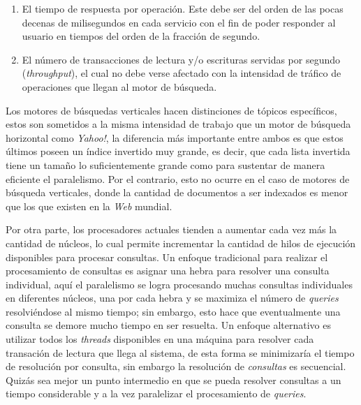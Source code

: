 \begin{enumerate}
  \item El tiempo de respuesta por operación. Este debe ser del orden de las pocas decenas de milisegundos en cada servicio con el fin de poder responder al usuario en tiempos del orden de la fracción de segundo.
  \item El número de transacciones de lectura y/o escrituras servidas por segundo (\textit{throughput}), el cual no debe verse afectado con la intensidad de tráfico de operaciones que llegan al motor de búsqueda.
\end{enumerate}

Los motores de búsquedas verticales hacen distinciones de tópicos específicos, estos son sometidos a la misma intensidad de trabajo que un motor de búsqueda horizontal como \textit{Yahoo!}, la diferencia más importante entre ambos es que estos últimos poseen un índice invertido muy grande, es decir, que cada lista invertida tiene un tamaño lo suficientemente grande como para sustentar de manera eficiente el paralelismo. Por el contrario, esto no ocurre en el caso de motores de búsqueda verticales, donde la cantidad de documentos a ser indexados es menor que los que existen en la \textit{Web} mundial.

Por otra parte, los procesadores actuales tienden a aumentar cada vez más la cantidad de núcleos, lo cual permite incrementar la cantidad de hilos de ejecución disponibles para procesar consultas. Un enfoque tradicional para realizar el procesamiento de consultas es asignar una hebra para resolver una consulta individual, aquí el paralelismo se logra procesando muchas consultas individuales en diferentes núcleos, una por cada hebra y se maximiza el número de \textit{queries} resolviéndose al mismo tiempo; sin embargo, esto hace que eventualmente una consulta se demore mucho tiempo en ser resuelta. Un enfoque alternativo es utilizar todos los \textit{threads} disponibles en una máquina para resolver cada transación de lectura que llega al sistema, de esta forma se minimizaría el tiempo de resolución por consulta, sin embargo la resolución de \textit{consultas} es secuencial. Quizás sea mejor un punto intermedio en que se pueda resolver consultas a un tiempo considerable y a la vez paralelizar el procesamiento de \textit{queries}.

